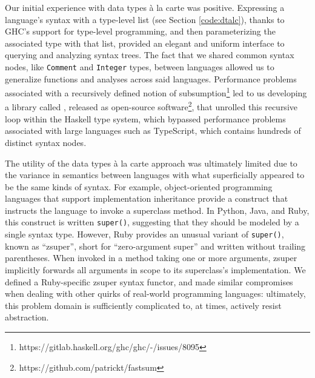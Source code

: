 \documentclass[acmsmall,fleqn]{acmart}
\begin{document}
Our initial experience with data types à la carte was positive. Expressing a
language's syntax with a type-level list (see Section \ref{code:dtalc}),
thanks to GHC's support for type-level programming, and then parameterizing
the associated type with that list, provided an elegant and uniform
interface to querying and analyzing syntax trees. The fact that we shared
common syntax nodes, like \texttt{Comment} and \texttt{Integer} types,
between languages allowed us to generalize functions and analyses across
said languages. Performance problems associated with a recursively defined
notion of subsumption\footnote{https://gitlab.haskell.org/ghc/ghc/-/issues/8095} led to us
developing a library called \fastsum{}, released as open-source
software\footnote{https://github.com/patrickt/fastsum},
that unrolled this recursive loop within the Haskell type system, which bypassed
performance problems associated with large languages such as TypeScript, which
contains hundreds of distinct syntax nodes.

The utility of the data types à la carte approach was ultimately limited due to
the variance in semantics between languages with what superficially appeared to
be the same kinds of syntax. For example, object-oriented programming languages
that support implementation inheritance provide a construct that instructs the
language to invoke a superclass method. In Python, Java, and Ruby, this
construct is written \texttt{super()}, suggesting that they should be modeled by
a single syntax type. However, Ruby provides an unusual variant of
\texttt{super()}, known as “zsuper”, short for “zero-argument super” and written
without trailing parentheses. When invoked in a method taking one or more
arguments, zsuper implicitly forwards all arguments in scope to its superclass’s
implementation. We defined a Ruby-specific zsuper syntax functor, and made
similar compromises when dealing with other quirks of real-world programming
languages: ultimately, this problem domain is sufficiently complicated to, at
times, actively resist abstraction.
\end{document}
